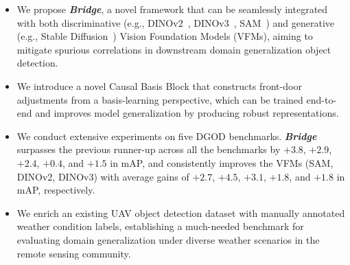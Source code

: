\begin{itemize}
\item We propose \textbf{\textit{Bridge}}, a novel framework that can be seamlessly integrated with both discriminative (e.g., DINOv2~\cite{oquab2023dinov2}, DINOv3~\cite{simeoni2025dinov3}, SAM~\cite{kirillov2023segment}) and generative (e.g., Stable Diffusion~\cite{rombach2022high}) Vision Foundation Models (VFMs), aiming to mitigate spurious correlations in downstream domain generalization object detection.
\item We introduce a novel Causal Basis Block that constructs front-door adjustments from a basis-learning perspective, which can be trained end-to-end and improves model generalization by producing robust representations.
\item We conduct extensive experiments on five DGOD benchmarks. 
\textbf{\textit{Bridge}} surpasses the previous runner-up across all the benchmarks by 
$\mathbf{+3.8}$, $\mathbf{+2.9}$, $\mathbf{+2.4}$, $\mathbf{+0.4}$, 
and $\mathbf{+1.5}$ in mAP, and consistently improves the VFMs (SAM, DINOv2, DINOv3) with average gains of 
$\mathbf{+2.7}$, $\mathbf{+4.5}$, $\mathbf{+3.1}$, $\mathbf{+1.8}$, 
and $\mathbf{+1.8}$ in mAP, respectively.

\item We enrich an existing UAV object detection dataset with manually annotated weather condition labels, establishing a much-needed benchmark for evaluating domain generalization under diverse weather scenarios in the remote sensing community.

\end{itemize}

